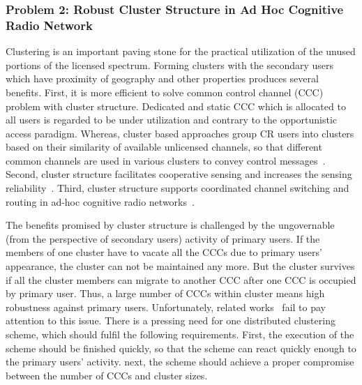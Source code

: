 \subsubsection{Problem 2: Robust Cluster Structure in Ad Hoc Cognitive Radio Network}
Clustering is an important paving stone for the practical utilization of the unused portions of the licensed spectrum.
Forming clusters with the secondary users which have proximity of geography and other properties produces several benefits.
First, it is more efficient to solve common control channel (\gls{CCC}) problem with cluster structure.
Dedicated and static CCC which is allocated to all users is regarded to be under utilization and contrary to the opportunistic access paradigm.
Whereas, cluster based approaches group CR users into clusters based on their similarity of available unlicensed channels, so that different common channels are used in various clusters to convey control messages~\cite{Lazos09}.
Second, cluster structure facilitates cooperative sensing and increases the sensing reliability~\cite{Sun07_clustering_spectrum_secsing}.
Third, cluster structure supports coordinated channel switching and routing in ad-hoc cognitive radio networks~\cite{cluster_routing_2013ICC}.

The benefits promised by cluster structure is challenged by the ungovernable (from the perspective of secondary users) activity of primary users.
If the members of one cluster have to vacate all the CCCs due to primary users' appearance, the cluster can not be maintained any more.
But the cluster survives if all the cluster members can migrate to another CCC after one CCC is occupied by primary user.
Thus, a large number of CCCs within cluster means high robustness against primary users.
Unfortunately, related works~\cite{Zhao07,Affinity_clustering_09icccn,Consensus_based_clustering12,clustering_globecom11} fail to pay attention to this issue.
There is a pressing need for one distributed clustering scheme, which should fulfil the following requirements.
First, the execution of the scheme should be finished quickly, so that the scheme can react quickly enough to the primary users' activity.
next, the scheme should achieve a proper compromise between the number of CCCs and cluster sizes.


